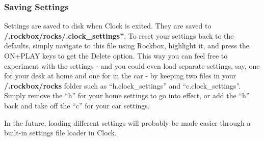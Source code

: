 \subsubsection{Saving Settings}
Settings are saved to disk when Clock is exited. They are saved to
\textbf{/.rockbox/rocks/.clock\_settings''}. To reset your settings
back to the defaults, simply navigate to this file using Rockbox,
highlight it, and press the ON+PLAY keys to get the Delete option. This way you can feel free to experiment with the settings {}- and you could even load
separate settings, say, one for your desk at home and one for in the car {}- by keeping two files in your \textbf{/.rockbox/rocks} folder such as
``h.clock\_settings'' and ``c.clock\_settings''. Simply remove the
``h'' for your home settings to go into effect, or add the ``h'' back and take off the ``c'' for your car settings.

In the future, loading different settings will probably be made easier
through a built{}-in settings file loader in Clock. 
